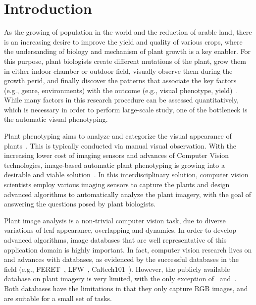 \section{Introduction}
\label{sec:intro}

As the growing of population in the world and the reduction of arable land, there is an increasing desire to improve the yield and quality of various crops, where the undersanding of biology and mechanism of plant growth is a key enabler.
For this purpose, plant biologists create different mutations of the plant, grow them in either indoor chamber or outdoor field, visually observe them during the growth perid, and finally discover the patterns that associate the   key factors (e.g., genre, environments) with the outcome (e.g., visual phenotype, yield)~\cite{}.
While many factors in this research procedure can be assessed quantitatively, which is necessary in order to perform large-scale study, one of the bottleneck is the automatic visual phenotyping.

Plant phenotyping aims to analyze and categorize the visual appearance of plants~\cite{}.
This is typically conducted via manual visual observation.
With the increasing lower cost of imaging sensors and advances of Computer Vision technologies, image-based automatic plant phenotyping is growing into a desirable and viable solution~\cite{}.
In this interdisciplinary solution, computer vision scientists employ various imaging sensors to capture the plants and design advanced algorithms to automatically analyze the plant imagery, with the goal of answering the questions posed by plant biologists.

Plant image analysis is a non-trivial computer vision task, due to diverse variations of leaf appearance, overlapping and dynamics.
In order to develop advanced algorithms, image databases that are well representative of this application domain is highly important.
In fact, computer vision research lives on and advances with databases, as evidenced by the successful databases in the field (e.g., FERET~\cite{Phillips2000}, LFW~\cite{LFW}, Caltech$101$~\cite{Fei-Fei2004}).
However, the publicly available database on plant imagery is very limited, with the only exception of~\cite{scharr2014annotated} and~\cite{haug2014crop}.
Both databases have the limitations in that they only capture RGB images, and are suitable for a small set of tasks.

